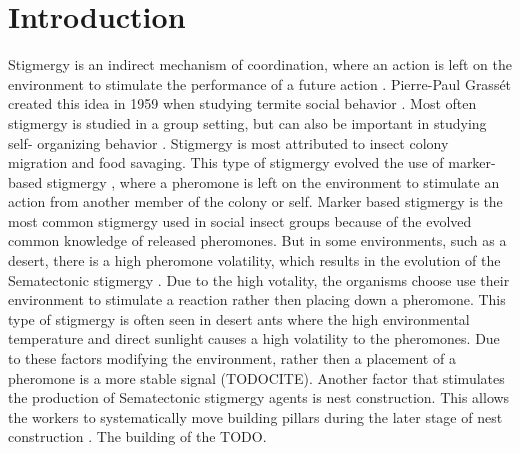 \section{Introduction}

Stigmergy is an indirect mechanism of coordination, where an action is left on the environment to stimulate the performance of a future action \cite{susi_social_2001, ahadeli_multi-agent_2004}.
Pierre-Paul Grassét created this idea in 1959 when studying termite social behavior \cite{heylighen_stigmergy_2016a}.
Most often stigmergy is studied in a group setting, but can also be important in studying self- organizing behavior \cite{heylighen_stigmergy_2016b}.
Stigmergy is most attributed to insect colony migration and food savaging.
This type of stigmergy evolved the use of marker-based stigmergy \cite{ahadeli_multi-agent_2004, heylighen_stigmergy_2016b}, where a pheromone is left on the environment to stimulate an action from another member of the colony or self.
Marker based stigmergy is the most common stigmergy used in social insect groups because of the evolved common knowledge of released pheromones.
But in some environments, such as a desert, there is a high pheromone volatility, which results in the evolution of the Sematectonic stigmergy \cite{ahadeli_multi-agent_2004}.
Due to the high votality, the organisms choose use their environment to stimulate a reaction rather then placing down a pheromone.
This type of stigmergy is often seen in desert ants where the high environmental temperature and direct sunlight causes a high volatility to the pheromones.
Due to these factors modifying the environment, rather then a placement of a pheromone is a more stable signal (TODOCITE).
Another factor that stimulates the production of Sematectonic stigmergy agents is nest construction.
This allows the workers to systematically move building pillars during the later stage of nest construction \cite{dorigo_ant_2000, dorigo_ant_2000}.
The building of the TODO.

